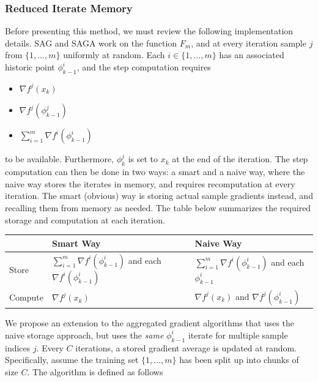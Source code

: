 \documentclass[11pt]{article}
\begin{document}
   \subsubsection{Reduced Iterate Memory}
    Before presenting this method, we must review the following implementation details. SAG and SAGA work on the function $F_m$, and at every iteration sample $j$ from $\{1,\ldots, m\}$ uniformly at random. Each $i \in \{1,\ldots, m\}$ has an associated historic point $\phi^i_{k-1}$, and the step computation requires 
	\begin{itemize}
		\item $\nabla f^j(x_k)$
		\item $\nabla f^j(\phi_{k-1}^j)$
		\item $\sum_{i=1}^{m}  \nabla f^i (\phi^i_{k-1})$
	\end{itemize}
	to be available. Furthermore, $\phi_k^j$ is set to $x_k$ at the end of the iteration. The step computation can then be done in two ways: a smart and a naive way, where the naive way stores the iterates in memory, and requires recomputation at every iteration. The smart (obvious) way is storing actual sample gradients instead, and recalling them from memory as needed. The table below summarizes the required storage and computation at each iteration. 
	\begin{table}[htb!]
		\label{table:label}
		\centering
		\begin{tabular}{lll}
			\toprule
			\textbf{} & \textbf{Smart Way} & \textbf{Naive Way}\\
			\midrule
			             Store &   $\sum_{i=1}^{m}  \nabla f^i (\phi^i_{k-1})$ and each $\nabla f^i (\phi^i_{k-1})$ &              $\sum_{i=1}^{m}  \nabla f^i (\phi^i_{k-1})$ and each $\phi^i_{k-1}$\\
			             Compute &              $\nabla f^j(x_k)$  &    $\nabla f^j(x_k)$ and $\nabla f^j(\phi^i_{k-1})$\\
			\bottomrule
		\end{tabular}
	\end{table}
	
	We propose an extension to the aggregated gradient algorithms that uses the naive storage approach, but uses the \emph{same} $\phi_{k-1}^i$ iterate for multiple sample indices $j$. Every $C$ iterations, a stored gradient average is updated at random. Specifically, assume the training set $\{1, \ldots, m \}$ has been split up into chunks of size $C$. The algorithm is defined as follows
	
\end{document}
